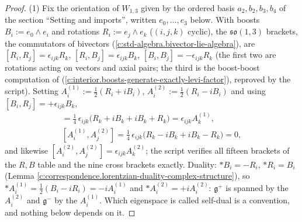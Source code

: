 \documentclass[11pt]{article}
\theoremstyle{definition}
\theoremstyle{plain}
\begin{document}
\begin{proof}
(1) Fix the orientation of $W_{1,3}$ given by the ordered basis $a_2, b_2, b_3, b_4$ of the section ``Setting and imports'', written $e_0, \dots, e_3$ below. With boosts $B_i := e_0\wedge e_i$ and rotations $R_i := e_j\wedge e_k$ ($(i,j,k)$ cyclic), the $\mathfrak{so}(1,3)$ brackets, the commutators of bivectors (\ref{c:std-algebra.bivector-lie-algebra}), are $[R_i, R_j] = \epsilon_{ijk}R_k$, $[R_i, B_j] = \epsilon_{ijk}B_k$, $[B_i, B_j] = -\epsilon_{ijk}R_k$ (the first two are rotations acting on vectors and axial pairs; the third is the boost-boost computation of \cite[Lem.~5.4]{ButlerT6} (\ref{c:interior.boosts-generate-exactly-levi-factor}), reproved by the script). Setting $A^{(1)}_i := \tfrac12(R_i + iB_i)$, $A^{(2)}_i := \tfrac12(R_i - iB_i)$ and using $[B_i, R_j] = +\epsilon_{ijk}B_k$,
\begin{gather*}
[A^{(1)}_i, A^{(1)}_j] = \tfrac14\,\epsilon_{ijk}\bigl(R_k + iB_k + iB_k + R_k\bigr) = \epsilon_{ijk}A^{(1)}_k,\\
[A^{(1)}_i, A^{(2)}_j] = \tfrac14\,\epsilon_{ijk}\bigl(R_k - iB_k + iB_k - R_k\bigr) = 0,
\end{gather*}
and likewise $[A^{(2)}_i, A^{(2)}_j] = \epsilon_{ijk}A^{(2)}_k$; the script verifies all fifteen brackets of the $R, B$ table and the nine cross brackets exactly. Duality: $\ast B_i = -R_i$, $\ast R_i = B_i$ (Lemma \ref{c:correspondence.lorentzian-duality-complex-structure}), so $\ast A^{(1)}_i = \tfrac12(B_i - iR_i) = -iA^{(1)}_i$ and $\ast A^{(2)}_i = +iA^{(2)}_i$: $\mathfrak{g}^+$ is spanned by the $A^{(2)}_i$ and $\mathfrak{g}^-$ by the $A^{(1)}_i$. Which eigenspace is called self-dual is a convention, and nothing below depends on it.

\end{proof}
\end{document}
